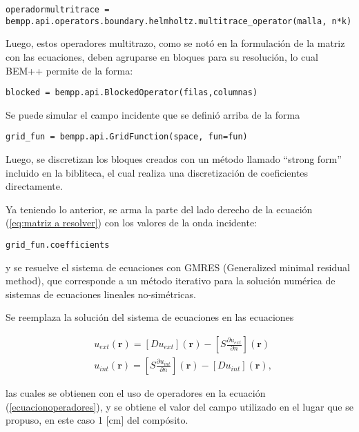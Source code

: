 \documentclass[12pt,letterpaper]{article}
\numberwithin{equation}{section}
\begin{document}
\begin{lstlisting}
operadormultritrace = bempp.api.operators.boundary.helmholtz.multitrace_operator(malla, n*k)
\end{lstlisting}

Luego, estos operadores multitrazo, como se notó en la formulación de la matriz con las ecuaciones, deben agruparse en bloques para su resolución, lo cual BEM++ permite de la forma: 

\begin{lstlisting}
blocked = bempp.api.BlockedOperator(filas,columnas)
\end{lstlisting}

Se puede simular el campo incidente que se definió arriba de la forma 

\begin{lstlisting}
grid_fun = bempp.api.GridFunction(space, fun=fun)
\end{lstlisting}

Luego, se discretizan los bloques creados con un método llamado ``strong form'' incluido en la bibliteca, el cual realiza una discretización de coeficientes directamente. 

Ya teniendo lo anterior, se arma la parte del lado derecho de la ecuación (\ref{eq:matriz a resolver}) con los valores de la onda incidente:

\begin{lstlisting}
grid_fun.coefficients
\end{lstlisting} 

\noindent y se resuelve el sistema de ecuaciones con GMRES (Generalized minimal residual method), que corresponde a un método iterativo para la solución numérica de sistemas de ecuaciones lineales no-simétricas.

Se reemplaza la solución del sistema de ecuaciones en las ecuaciones 

\begin{equation}
\begin{split}
&u_{ext}(\textbf{r})=\left[D u_{ext}\right](\textbf{r}) - \left[S \frac{\partial u_{ext}}{\partial n}\right](\textbf{r})\\
&u_{int}(\textbf{r})= \left[S \frac{\partial u_{int}}{\partial n}\right](\textbf{r}) - \left[D u_{int}\right](\textbf{r}),
\end{split}
\label{eq: BIE_potencial}
\end{equation}

\noindent las cuales se obtienen con el uso de operadores en la ecuación (\ref{ecuacionoperadores}), y se obtiene el valor del campo utilizado en el lugar que se propuso, en este caso  1 [cm] del compósito.
\end{document}

